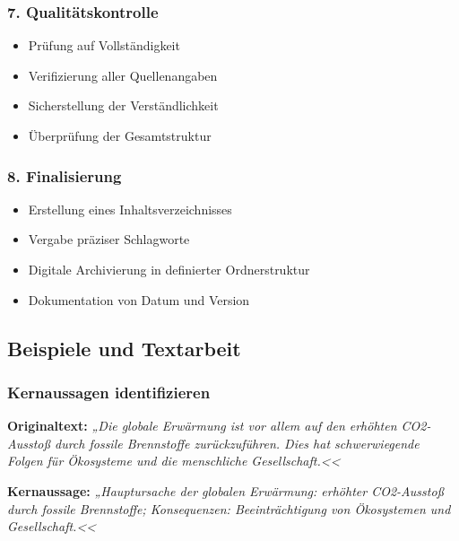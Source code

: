 \documentclass{vorlage-design-main}
\begin{document}
\subsubsection{7. Qualitätskontrolle}\label{qualitaetskontrolle}

\begin{itemize}

\item
  Prüfung auf Vollständigkeit
\item
  Verifizierung aller Quellenangaben
\item
  Sicherstellung der Verständlichkeit
\item
  Überprüfung der Gesamtstruktur
\end{itemize}

\subsubsection{8. Finalisierung}\label{finalisierung}

\begin{itemize}

\item
  Erstellung eines Inhaltsverzeichnisses
\item
  Vergabe präziser Schlagworte
\item
  Digitale Archivierung in definierter Ordnerstruktur
\item
  Dokumentation von Datum und Version
\end{itemize}

\subsection{Beispiele und Textarbeit}\label{beispiele-und-textarbeit}

\subsubsection{Kernaussagen
identifizieren}\label{kernaussagen-identifizieren}

\textbf{Originaltext:} \emph{„Die globale Erwärmung ist vor allem auf
den erhöhten CO2-Ausstoß durch fossile Brennstoffe zurückzuführen. Dies
hat schwerwiegende Folgen für Ökosysteme und die menschliche
Gesellschaft.<<}

\textbf{Kernaussage:} \emph{„Hauptursache der globalen Erwärmung:
erhöhter CO2-Ausstoß durch fossile Brennstoffe; Konsequenzen:
Beeinträchtigung von Ökosystemen und Gesellschaft.<<}
\end{document}
